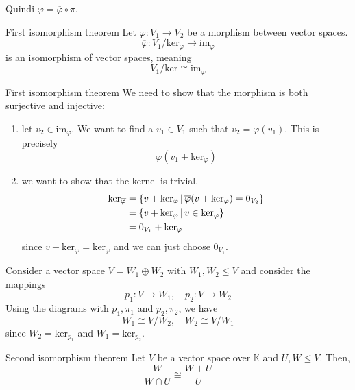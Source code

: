 \documentclass[a4paper]{article}
\begin{document}
Quindi \(\varphi = \overline{\varphi} \circ \pi\).

\begin{snippettheorem}{First isomorphism theorem}
    Let \(\varphi \colon V_1 \to V_2\) be a morphism between vector spaces.
    \[
        \overline{\varphi} \colon V_1 / \text{ker}_\varphi \to \text{im}_\varphi
    \]
    is an isomorphism of vector spaces, meaning
    \[
        V_1 / \text{ker} \cong \text{im}_{\varphi}
    \]
\end{snippettheorem}

\begin{snippetproof}{First isomorphism theorem}
    We need to show that the morphism is both surjective and injective:
    \begin{enumerate}
        \item let \(v_2 \in \text{im}_\varphi\).
            We want to find a \(v_1 \in V_1\) such that \(v_2 = \varphi(v_1)\).
            This is precisely
            \[
                \overline{\varphi}(v_1 + \text{ker}_\varphi)
            \]
        \item we want to show that the kernel is trivial.
            \begin{align*}
                \text{ker}_{\overline{\varphi}} &= \{
                    v + \text{ker}_\varphi \,|\,
                    \overline{\varphi}(v + \text{ker}_\varphi) = 0_{V_2}
                \} \\
                &= \{v + \text{ker}_\varphi \,|\, v \in
                \text{ker}_\varphi\} \\
                &= 0_{V_1} + \text{ker}_\varphi
            \end{align*}
            since \(v + \text{ker}_\varphi = \text{ker}_\varphi\) and
            we can just choose \(0_{V_1}\).
    \end{enumerate}
\end{snippetproof}

\begin{snippetexample}{}
    Consider a vector space \(V = W_1 \oplus W_2\) with \(W_1, W_2 \leq V\)
    and consider the mappings
    \[
        p_1 \colon V \to W_1, \quad p_2 \colon V \to W_2
    \]
    Using the diagrams with \(\overline{p_1},\pi_1\) and
    \(\overline{p_2},\pi_2\),
    we have
    \[
        W_1 \cong V/W_2, \quad W_2 \cong V/W_1
    \]
    since \(W_2 = \text{ker}_{p_1}\) and \(W_1 = \text{ker}_{p_2}\).
\end{snippetexample}

\begin{snippettheorem}{Second isomorphism theorem}
    Let \(V\) be a vector space over \(\mathbb{K}\) and \(U, W \leq V\).
    Then,
    \[
        \frac{W}{W \cap U} \cong \frac{W + U}{U}
    \]
\end{snippettheorem}
\end{document}
